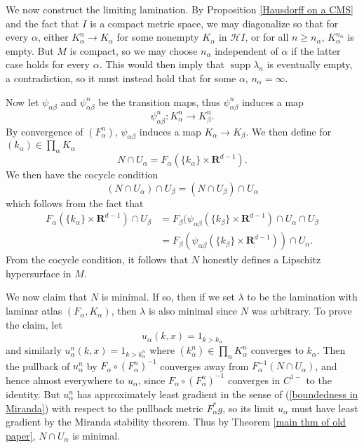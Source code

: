 \documentclass[reqno,11pt]{amsart}
\newcommand{\RR}{\mathbf{R}}
\DeclareMathOperator{\supp}{supp}
\newcommand{\Hypspace}{\mathscr H}
\theoremstyle{definition}
\numberwithin{equation}{section}
\begin{document}
We now construct the limiting lamination.
By Proposition \ref{Hausdorff on a CMS} and the fact that $I$ is a compact metric space, we may diagonalize so that for every $\alpha$, either $K^n_\alpha \to K_\alpha$ for some nonempty $K_\alpha$ in $\Hypspace I$, or for all $n \geq n_\alpha$, $K_\alpha^{n_\alpha}$ is empty.
But $M$ is compact, so we may choose $n_\alpha$ independent of $\alpha$ if the latter case holds for every $\alpha$.
This would then imply that $\supp \lambda_n$ is eventually empty, a contradiction, so it must instead hold that for some $\alpha$, $n_\alpha = \infty$.

Now let $\psi_{\alpha \beta}$ and $\psi_{\alpha \beta}^n$ be the transition maps, thus $\psi_{\alpha \beta}^n$ induces a map
$$\psi_{\alpha \beta}^n: K_\alpha^n \to K_\beta^n.$$
By convergence of $(F_\alpha^n)$, $\psi_{\alpha \beta}$ induces a map $K_\alpha \to K_\beta$.
We then define for $(k_\alpha) \in \prod_\alpha K_\alpha$
$$N \cap U_\alpha = F_\alpha(\{k_\alpha\} \times \RR^{d - 1}).$$
We then have the cocycle condition
$$(N \cap U_\alpha) \cap U_\beta = (N \cap U_\beta) \cap U_\alpha$$
which follows from the fact that
\begin{align*}
F_\alpha(\{k_\alpha\} \times \RR^{d - 1}) \cap U_\beta
&= F_\beta(\psi_{\alpha \beta}(\{k_\beta\} \times \RR^{d - 1}) \cap U_\alpha \cap U_\beta \\
&= F_\beta(\psi_{\alpha \beta}(\{k_\beta\} \times \RR^{d - 1})) \cap U_\alpha.
\end{align*}
From the cocycle condition, it follows that $N$ honestly defines a Lipschitz hypersurface in $M$.

We now claim that $N$ is minimal.
If so, then if we set $\lambda$ to be the lamination with laminar atlas $(F_\alpha, K_\alpha)$, then $\lambda$ is also minimal since $N$ was arbitrary.
To prove the claim, let
$$u_\alpha(k, x) = 1_{k > k_\alpha}$$
and similarly $u_\alpha^n(k, x) = 1_{k > k_\alpha^n}$ where $(k_\alpha^n) \in \prod_n K_\alpha^n$ converges to $k_\alpha$.
Then the pullback of $u_\alpha^n$ by $F_\alpha \circ (F_\alpha^n)^{-1}$ converges away from $F_\alpha^{-1}(N \cap U_\alpha)$, and hence almost everywhere to $u_\alpha$, since $F_\alpha \circ (F_\alpha^n)^{-1}$ converges in $C^{1-}$ to the identity.
But $u_\alpha^n$ has approximately least gradient in the sense of (\ref{boundedness in Miranda}) with respect to the pullback metric $F_\alpha^* g$, so its limit $u_\alpha$ must have least gradient by the Miranda stability theorem.
Thus by Theorem \ref{main thm of old paper}, $N \cap U_\alpha$ is minimal.
\end{document}
